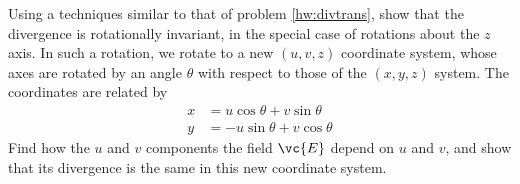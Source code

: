 Using a techniques similar to that of problem \ref{hw:divtrans},
        show that the divergence is rotationally invariant,
        in the special case of rotations about the $z$ axis.
        In such a rotation, we rotate to a new $(u,v,z)$
        coordinate system, whose axes are rotated by an angle
        $\theta $ with respect to those of the $(x,y,z)$ system. The
        coordinates are related by
        \begin{align*}
                        x  &=  u \cos  \theta  + v \sin  \theta   \\
                        y  &=  -u \sin  \theta  + v \cos  \theta   
        \end{align*}
        Find how the $u$ and $v$ components the field $\vc{E}$ depend on $u$
        and $v$, and show that its divergence is the same in this
        new coordinate system.
